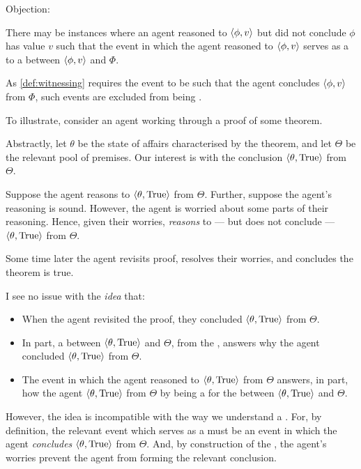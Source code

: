\begin{note}
  Objection:

  There may be instances where an agent reasoned to \(\langle \phi, v \rangle\) but did not conclude \(\phi\) has value \(v\) such that the event in which the agent reasoned to \(\langle \phi, v \rangle\) serves as a \wit{} to a \ros{} between \(\langle \phi, v \rangle\) and \(\Phi\).

  As \autoref{def:witnessing} requires the event to be such that the agent concludes \(\langle \phi, v \rangle\) from \(\Phi\), such events are excluded from being .

  To illustrate, consider an agent working through a proof of some theorem.

  Abstractly, let \(\theta\) be the state of affairs characterised by the theorem, and let \(\Theta\) be the relevant pool of premises.
  Our interest is with the conclusion \(\langle \theta, \text{True} \rangle\) from \(\Theta\).

  Suppose the agent reasons to \(\langle \theta, \text{True} \rangle\) from \(\Theta\).
  Further, suppose the agent's reasoning is sound.
  However, the agent is worried about some parts of their reasoning.
  Hence, given their worries, \emph{reasons} to --- but does not conclude --- \(\langle \theta, \text{True} \rangle\) from \(\Theta\).

  Some time later the agent revisits proof, resolves their worries, and concludes the theorem is true.

  I see no issue with the \emph{idea} that:
  \begin{itemize}[noitemsep]
  \item
    When the agent revisited the proof, they concluded \(\langle \theta, \text{True} \rangle\) from \(\Theta\).
  \item
    In part, a \ros{} between \(\langle \theta, \text{True} \rangle\) and \(\Theta\), from the \agpe{}, answers why the agent concluded \(\langle \theta, \text{True} \rangle\) from \(\Theta\).
  \item
    The event in which the agent reasoned to \(\langle \theta, \text{True} \rangle\) from \(\Theta\) answers, in part, how the agent \(\langle \theta, \text{True} \rangle\) from \(\Theta\) by being a \wit{} for the \ros{} between \(\langle \theta, \text{True} \rangle\) and \(\Theta\).
  \end{itemize}

  However, the idea is incompatible with the way we understand a .
  For, by definition, the relevant event which serves as a  must be an event in which the agent \emph{concludes} \(\langle \theta, \text{True} \rangle\) from \(\Theta\).
  And, by construction of the , the agent's worries prevent the agent from forming the relevant conclusion.


\end{note}
